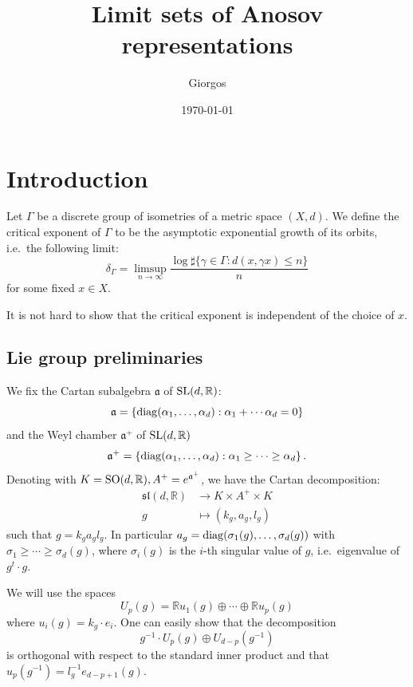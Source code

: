\documentclass{report}
\title{Limit sets of Anosov representations}
\author{Giorgos}
\date{\today}
\begin{document}
\maketitle

\tableofcontents

\chapter{Introduction}
\begin{definition}
    Let $\Gamma$ be a discrete group of isometries of a metric space $(X,d)$.
    We define the critical exponent of $\Gamma$ to be the asymptotic exponential growth of its orbits, i.e.\ the following limit:
    \[
    \delta_\Gamma = \limsup_{n\to \infty} \frac{\log \sharp \{ \gamma \in \Gamma : d(x, \gamma x) \leq n \}}{n}
    \]
    for some fixed $x \in X$.
\end{definition}
\remark
It is not hard to show that the critical exponent is independent of the choice of $x$.
\section{Lie group preliminaries}
We fix the Cartan subalgebra $\mathfrak a$ of $\operatorname{{\mathrm{SL}}}(d,\mathbb R)$:
\[
    \mathfrak a = \left\{
        \operatorname{diag}(\alpha_1, \ldots, \alpha_d) : \alpha_1 + \cdots \alpha_d = 0
    \right\}
\]
and the Weyl chamber $\mathfrak a^+$ of $\operatorname{{\mathrm{SL}}}(d,\mathbb R)$
\[
    \mathfrak a^+ = \left\{
        \operatorname{diag}(\alpha_1, \ldots, \alpha_d) : \alpha_1 \geq \cdots \geq \alpha_d
    \right\}.
\]
Denoting with $K = \operatorname{{\mathrm{SO}}}(d, \mathbb R), A^+ = e^{\mathfrak a^+} $, we have the Cartan decomposition:
\begin{align*}
    \mathfrak{sl}(d, \mathbb R) &\rightarrow K \times A^+ \times K\\
    g &\mapsto (k_g, a_g, l_g) 
\end{align*}
such that $g = k_g a_g l_g$.
In particular $a_g = \operatorname{diag}(\sigma_1(g), \ldots, \sigma_d(g))$ with $\sigma_1 \geq \cdots \geq \sigma_d(g)$,
where $\sigma_i(g)$ is the $i$-th singular value of $g$, i.e.\ eigenvalue of $g^t \cdot g$.

We will use the spaces
\[
    U_p(g) = \mathbb R u_1(g) \oplus \cdots \oplus \mathbb R u_p(g)   
\]
where $u_i(g) = k_g \cdot e_i$.
One can easily show that the decomposition
\[
    g^{-1} \cdot U_p(g) \oplus U_{d-p}(g^{-1})
\]
is orthogonal with respect to the standard inner product and that
$u_p(g^{-1}) = l_g^{-1} e_{d-p+1}(g).$
\end{document}
